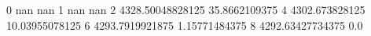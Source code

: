 0 nan nan
1 nan nan
2 4328.50048828125 35.8662109375
4 4302.673828125 10.03955078125
6 4293.7919921875 1.15771484375
8 4292.63427734375 0.0
